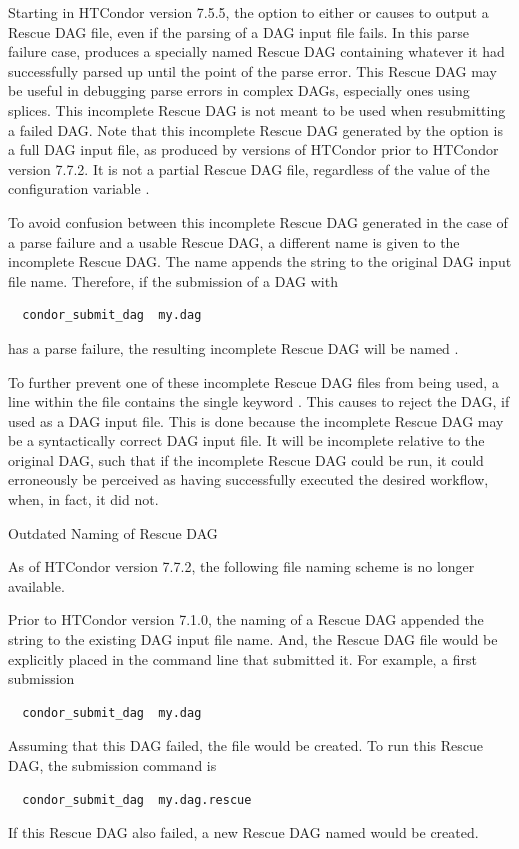Starting in HTCondor version 7.5.5,
the  option to either  or 
causes  to output a Rescue DAG file, 
even if the parsing of a DAG input file fails.
In this parse failure case,  produces a specially 
named Rescue DAG containing whatever it had successfully parsed up
until the point of the parse error.
This Rescue DAG may be useful in debugging parse errors in complex DAGs,
especially ones using splices.
This incomplete Rescue DAG is not meant to be used when resubmitting
a failed DAG.  
Note that this incomplete Rescue DAG generated by the 
option is a full DAG input file, 
as produced by versions of HTCondor prior to HTCondor version 7.7.2.
It is not a partial Rescue DAG file,
regardless of the value of the configuration variable
.

To avoid confusion between this incomplete Rescue DAG
generated in the case of a parse failure and a usable Rescue DAG,
a different name is given to the incomplete Rescue DAG.
The name appends the string  to the original
DAG input file name.
Therefore, if the submission of a DAG with
\begin{verbatim}
  condor_submit_dag  my.dag
\end{verbatim}
has a parse failure, the resulting incomplete Rescue DAG will be
named .

To further prevent one of these incomplete Rescue DAG files from being used,
a line within the file contains the single keyword .
This causes  to reject the DAG, if used as a DAG input file.
This is done because the
incomplete Rescue DAG may be a syntactically correct DAG input file.
It will be incomplete relative to the original DAG,
such that if the incomplete Rescue DAG could be run,
it could erroneously be perceived as
having successfully executed the desired workflow, when, in fact,
it did not.

\begin{description}
\item[Outdated Naming of Rescue DAG]
\end{description}
As of HTCondor version 7.7.2, the following file naming scheme is 
no longer available.

Prior to HTCondor version 7.1.0, the naming of a Rescue DAG
appended the string  to the existing DAG input
file name. 
And, the Rescue DAG file would be explicitly placed in 
the command line that submitted it.
For example,  a first submission
\begin{verbatim}
  condor_submit_dag  my.dag
\end{verbatim}
Assuming that this DAG failed, the file 
would be created.
To run this Rescue DAG, the submission command is
\begin{verbatim}
  condor_submit_dag  my.dag.rescue
\end{verbatim}
If this Rescue DAG also failed, a new Rescue DAG named
 would be created.

